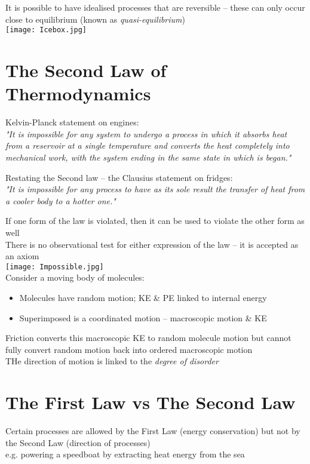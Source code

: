 \documentclass[a4paper, 11pt, fleqn, normalem]{report}
\begin{document}
It is possible to have idealised processes that are reversible -- these can only occur close to equilibrium (known as \emph{quasi-equilibrium}) \\
\texttt{[image: Icebox.jpg]}

\section*{The Second Law of Thermodynamics}
Kelvin-Planck statement on engines: \\
\emph{"It is impossible for any system to undergo a process in which it absorbs heat from a reservoir at a single temperature and converts the heat completely into mechanical work, with the system ending in the same state in which is began."}

Restating the Second law -- the Clausius statement on fridges: \\
\emph{"It is impossible for any process to have as its sole result the transfer of heat from a cooler body to a hotter one."}

If one form of the law is violated, then it can be used to violate the other form as well \\
There is no observational test for either expression of the law -- it is accepted as an axiom \\
\texttt{[image: Impossible.jpg]} \\
Consider a moving body of molecules:
\vspace{-8pt}
\begin{itemize}
	\item[] Molecules have random motion; KE \& PE linked to internal energy
	\item[] Superimposed is a coordinated motion -- macroscopic motion \& KE
\end{itemize}
\vspace{-8pt}
Friction converts this macroscopic KE to random molecule motion but cannot fully convert random motion back into ordered macroscopic motion \\
THe direction of motion is linked to the \emph{degree of disorder}

\section*{The First Law vs The Second Law}
Certain processes are allowed by the First Law (energy conservation) but not by the Second Law (direction of processes) \\
e.g. powering a speedboat by extracting heat energy from the sea
\end{document}
